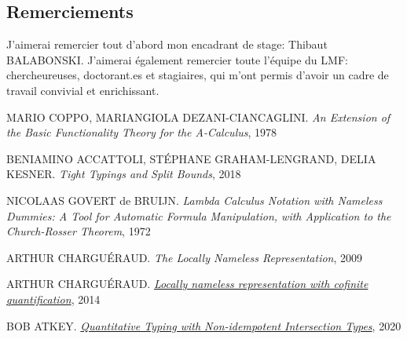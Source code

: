 \documentclass[10pt]{article}
\begin{document}
\subsection*{Remerciements}
J'aimerai remercier tout d'abord mon encadrant de stage: Thibaut BALABONSKI. J'aimerai également remercier toute l'équipe du LMF: chercheureuses, doctorant.es et stagiaires, qui m'ont permis d'avoir un cadre de travail convivial et enrichissant.

\begin{thebibliography}{9}
  MARIO COPPO, MARIANGIOLA DEZANI-CIANCAGLINI. \textit{An Extension of the Basic Functionality Theory for the A-Calculus}, 1978

  BENIAMINO ACCATTOLI, STÉPHANE GRAHAM-LENGRAND, DELIA KESNER. \textit{Tight Typings and Split Bounds}, 2018

  NICOLAAS GOVERT de BRUIJN. \textit{Lambda Calculus Notation with Nameless Dummies: A Tool for Automatic Formula Manipulation, with Application to the Church-Rosser Theorem}, 1972
  
  ARTHUR CHARGUÉRAUD. \textit{The Locally Nameless Representation}, 2009

  ARTHUR CHARGUÉRAUD. \href{http://www.chargueraud.org/softs/ln/}{\textit{Locally nameless representation with cofinite quantification}}, 2014

  BOB ATKEY. \href{https://bentnib.org/posts/2020-08-13-non-idempotent-intersection-types.html}{\textit{Quantitative Typing with Non-idempotent Intersection Types}}, 2020

\end{thebibliography}
  
\end{document}
